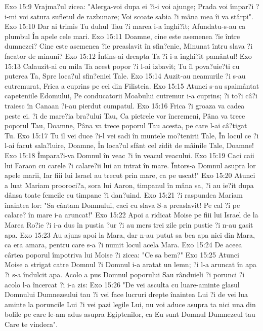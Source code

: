 Exo 15:9  Vrajma?ul zicea: "Alerga-voi dupa ei ?i-i voi ajunge; Prada voi împar?i ?i-mi voi satura sufletul de razbunare; Voi scoate sabia ?i mâna mea îi va stârpi".
Exo 15:10  Dar ai trimis Tu duhul Tau ?i marea i-a înghi?it; Afundatu-s-au ca plumbul În apele cele mari.
Exo 15:11  Doamne, cine este asemenea ?ie între dumnezei? Cine este asemenea ?ie preaslavit în sfin?enie, Minunat întru slava ?i facator de minuni?
Exo 15:12  Întins-ai dreapta Ta ?i i-a înghi?it pamântul!
Exo 15:13  Calauzit-ai cu mila Ta acest popor ?i l-ai izbavit; Tu îl pova?uie?ti cu puterea Ta, Spre loca?ul sfin?eniei Tale.
Exo 15:14  Auzit-au neamurile ?i s-au cutremurat, Frica a cuprins pe cei din Filisteia.
Exo 15:15  Atunci s-au spaimântat capeteniile Edomului, Pe conducatorii Moabului cutremur i-a cuprins; ?i to?i câ?i traiesc în Canaan ?i-au pierdut cumpatul.
Exo 15:16  Frica ?i groaza va cadea peste ei. ?i de mare?ia bra?ului Tau, Ca pietrele vor încremeni, Pâna va trece poporul Tau, Doamne, Pâna va trece poporul Tau acesta, pe care l-ai câ?tigat Tu.
Exo 15:17  Tu îl vei duce ?i-l vei sadi în muntele mo?tenirii Tale, În locul ce ?i l-ai facut sala?luire, Doamne, În loca?ul sfânt cel zidit de mâinile Tale, Doamne!
Exo 15:18  Împara?i-va Domnul în veac ?i în veacul veacului.
Exo 15:19  Caci caii lui Faraon cu carele ?i calare?ii lui au intrat în mare. Întors-a Domnul asupra lor apele marii, Iar fiii lui Israel au trecut prin mare, ca pe uscat!"
Exo 15:20  Atunci a luat Mariam prooroci?a, sora lui Aaron, timpanul în mâna sa, ?i au ie?it dupa dânsa toate femeile cu timpane ?i dan?uind.
Exo 15:21  ?i raspundea Mariam înaintea lor: "Sa cântam Domnului, caci cu slava S-a preaslavit! Pe cal ?i pe calare? în mare i-a aruncat!"
Exo 15:22  Apoi a ridicat Moise pe fiii lui Israel de la Marea Ro?ie ?i i-a dus în pustia ?ur ?i au mers trei zile prin pustie ?i n-au gasit apa.
Exo 15:23  Au ajuns apoi la Mara, dar n-au putut sa bea apa nici din Mara, ca era amara, pentru care s-a ?i numit locul acela Mara.
Exo 15:24  De aceea cârtea poporul împotriva lui Moise ?i zicea: "Ce sa bem?"
Exo 15:25  Atunci Moise a strigat catre Domnul ?i Domnul i-a aratat un lemn; ?i l-a aruncat în apa ?i s-a îndulcit apa. Acolo a pus Domnul poporului Sau rânduieli ?i porunci ?i acolo l-a încercat ?i i-a zis:
Exo 15:26  "De vei asculta cu luare-aminte glasul Domnului Dumnezeului tau ?i vei face lucruri drepte înaintea Lui ?i de vei lua aminte la poruncile Lui ?i vei pazi legile Lui, nu voi aduce asupra ta nici una din bolile pe care le-am adus asupra Egiptenilor, ca Eu sunt Domnul Dumnezeul tau Care te vindeca".
